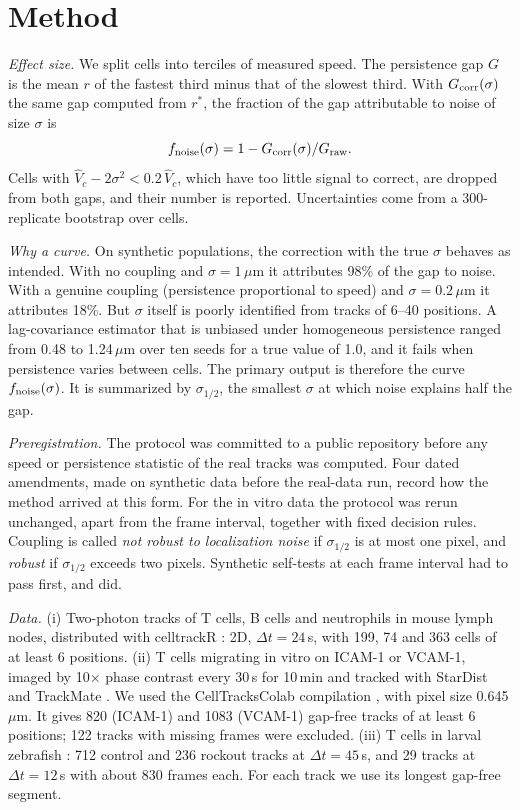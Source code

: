 \documentclass[aps,pre,10pt,twocolumn,superscriptaddress,amsmath,amssymb,floatfix]{revtex4-2}
\begin{document}
\section{Method}

\emph{Effect size.} We split cells into terciles of measured speed. The persistence gap $G$ is the mean $r$ of the fastest third minus that of the slowest third. With $G_{\rm corr}(\sigma)$ the same gap computed from $r^*$, the fraction of the gap attributable to noise of size $\sigma$ is
\begin{equation}
f_{\rm noise}(\sigma)=1-G_{\rm corr}(\sigma)/G_{\rm raw}.
\end{equation}
Cells with $\hat V_c-2\sigma^2<0.2\,\hat V_c$, which have too little signal to correct, are dropped from both gaps, and their number is reported. Uncertainties come from a 300-replicate bootstrap over cells.

\emph{Why a curve.} On synthetic populations, the correction with the true $\sigma$ behaves as intended. With no coupling and $\sigma=1$\,$\mu$m it attributes 98\% of the gap to noise. With a genuine coupling (persistence proportional to speed) and $\sigma=0.2$\,$\mu$m it attributes 18\%. But $\sigma$ itself is poorly identified from tracks of 6--40 positions. A lag-covariance estimator that is unbiased under homogeneous persistence ranged from 0.48 to 1.24\,$\mu$m over ten seeds for a true value of 1.0, and it fails when persistence varies between cells. The primary output is therefore the curve $f_{\rm noise}(\sigma)$. It is summarized by $\sigma_{1/2}$, the smallest $\sigma$ at which noise explains half the gap.

\emph{Preregistration.} The protocol was committed to a public repository before any speed or persistence statistic of the real tracks was computed. Four dated amendments, made on synthetic data before the real-data run, record how the method arrived at this form. For the in vitro data the protocol was rerun unchanged, apart from the frame interval, together with fixed decision rules. Coupling is called \emph{not robust to localization noise} if $\sigma_{1/2}$ is at most one pixel, and \emph{robust} if $\sigma_{1/2}$ exceeds two pixels. Synthetic self-tests at each frame interval had to pass first, and did.

\emph{Data.} (i) Two-photon tracks of T cells, B cells and neutrophils in mouse lymph nodes, distributed with celltrackR \cite{Wortel2021}: 2D, $\Delta t=24$\,s, with 199, 74 and 363 cells of at least 6 positions. (ii) T cells migrating in vitro on ICAM-1 or VCAM-1, imaged by 10$\times$ phase contrast every 30\,s for 10\,min and tracked with StarDist and TrackMate \cite{Fazeli2020,ZenodoTcell2020}. We used the CellTracksColab compilation \cite{ZenodoTcell2023,GomezDeMariscal2024}, with pixel size 0.645\,$\mu$m. It gives 820 (ICAM-1) and 1083 (VCAM-1) gap-free tracks of at least 6 positions; 122 tracks with missing frames were excluded. (iii) T cells in larval zebrafish \cite{Jerison2020}: 712 control and 236 rockout tracks at $\Delta t=45$\,s, and 29 tracks at $\Delta t=12$\,s with about 830 frames each. For each track we use its longest gap-free segment.
\end{document}
